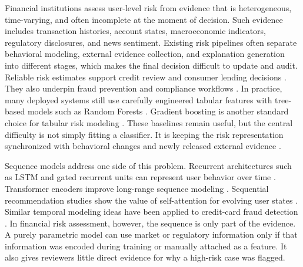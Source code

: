 \documentclass[runningheads]{llncs}
\begin{document}
Financial institutions assess user-level risk from evidence that is heterogeneous, time-varying, and often incomplete at the moment of decision. Such evidence includes transaction histories, account states, macroeconomic indicators, regulatory disclosures, and news sentiment. Existing risk pipelines often separate behavioral modeling, external evidence collection, and explanation generation into different stages, which makes the final decision difficult to update and audit. Reliable risk estimates support credit review and consumer lending decisions \cite{hand1997statistical,thomas2000survey}. They also underpin fraud prevention and compliance workflows \cite{bolton2002statistical,ngai2011application}. In practice, many deployed systems still use carefully engineered tabular features with tree-based models such as Random Forests \cite{breiman2001random}. Gradient boosting is another standard choice for tabular risk modeling \cite{friedman2001greedy,chen2016xgboost}. These baselines remain useful, but the central difficulty is not simply fitting a classifier. It is keeping the risk representation synchronized with behavioral changes and newly released external evidence \cite{crook2007recent,lessmann2015benchmarking}.

Sequence models address one side of this problem. Recurrent architectures such as LSTM and gated recurrent units can represent user behavior over time \cite{hochreiter1997lstm,cho2014learning}. Transformer encoders improve long-range sequence modeling \cite{vaswani2017attention}. Sequential recommendation studies show the value of self-attention for evolving user states \cite{kang2018sasrec,sun2019bert4rec}. Similar temporal modeling ideas have been applied to credit-card fraud detection \cite{jurgovsky2018sequence}. In financial risk assessment, however, the sequence is only part of the evidence. A purely parametric model can use market or regulatory information only if that information was encoded during training or manually attached as a feature. It also gives reviewers little direct evidence for why a high-risk case was flagged.
\end{document}
